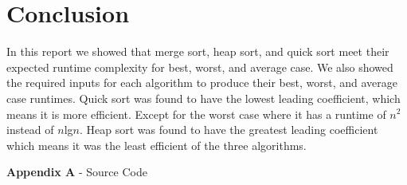 \documentclass[a4paper]{article}
\begin{document}
    \section{Conclusion}
    In this report we showed that merge sort, heap sort, and quick sort meet their 
    expected runtime complexity for best, worst, and average case. We also showed the
    required inputs for each algorithm to produce their best, worst, and average case
    runtimes. Quick sort was found to have the lowest leading coefficient, which means
    it is more efficient. Except for the worst case where it has a runtime of $n^{2}$
    instead of $n$lg$n$. Heap sort was found to have the greatest leading coefficient
    which means it was the least efficient of the three algorithms.



    \newpage
    \textbf{Appendix A} - Source Code
\end{document}
